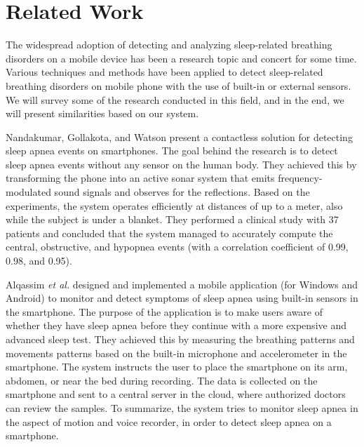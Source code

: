 \chapter{Related Work}
The widespread adoption of detecting and analyzing sleep-related breathing disorders on a mobile device has been a research topic and concert for some time. Various techniques and methods have been applied to detect sleep-related breathing disorders on mobile phone with the use of built-in or external sensors. We will survey some of the research conducted in this field, and in the end, we will present similarities based on our system. 

Nandakumar, Gollakota, and Watson \cite{contactless_sleep} present a contactless solution for detecting sleep apnea events on smartphones. The goal behind the research is to detect sleep apnea events without any sensor on the human body. They achieved this by transforming the phone into an active sonar system that emits frequency-modulated sound signals and observes for the reflections. Based on the experiments, the system operates efficiently at distances of up to a meter, also while the subject is under a blanket. They performed a clinical study with 37 patients and concluded that the system managed to accurately compute the central, obstructive, and hypopnea events (with a correlation coefficient of 0.99, 0.98, and 0.95). 

Alqassim \textit{et al.} \cite{sam} designed and implemented a mobile application (for Windows and Android) to monitor and detect symptoms of sleep apnea using built-in sensors in the smartphone. The purpose of the application is to make users aware of whether they have sleep apnea before they continue with a more expensive and advanced sleep test. They achieved this by measuring the breathing patterns and movements patterns based on the built-in microphone and accelerometer in the smartphone. The system instructs the user to place the smartphone on its arm, abdomen, or near the bed during recording. The data is collected on the smartphone and sent to a central server in the cloud, where authorized doctors can review the samples. To summarize, the system tries to monitor sleep apnea in the aspect of motion and voice recorder, in order to detect sleep apnea on a smartphone. 

